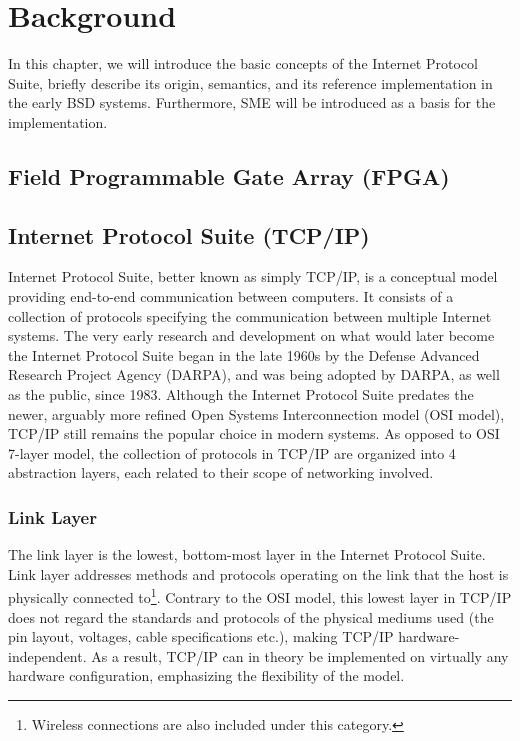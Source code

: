 \chapter{Background}


In this chapter, we will introduce the basic concepts of the Internet Protocol
Suite, briefly describe its origin, semantics, and its reference implementation
in the early BSD systems.
Furthermore, SME will be introduced as a basis for the implementation.


\section{Field Programmable Gate Array (FPGA)}



\section{Internet Protocol Suite (TCP/IP)}
Internet Protocol Suite, better known as simply TCP/IP, is a conceptual
model providing end-to-end communication between computers. It consists of
a collection of protocols specifying the communication between multiple
Internet systems\cite{RFC1122}.  The very early research and development
on what would later become the Internet Protocol Suite began in the late 1960s
by the Defense Advanced Research Project Agency (DARPA), and was being
adopted by DARPA, as well as the public, since 1983\cite{DARPA_internet}.
Although the Internet Protocol Suite predates the newer, arguably more
refined Open Systems Interconnection model (OSI model), TCP/IP still
remains the popular choice in modern systems.  As opposed to OSI 7-layer
model\cite{X.200}, the collection of protocols in TCP/IP are organized
into 4 abstraction layers, each related to their scope of networking
involved.

\subsection{Link Layer}
The link layer is the lowest, bottom-most layer in the Internet Protocol Suite.
Link layer addresses methods and protocols operating on the link that the host
is physically connected to\footnote{Wireless connections are also included
under this category.}. Contrary to the OSI model, this lowest layer in TCP/IP
does not regard the standards and protocols of the physical mediums used (the
pin layout, voltages, cable specifications etc.), making TCP/IP hardware-independent.
As a result, TCP/IP can in theory be implemented on virtually any hardware
configuration, emphasizing the flexibility of the model.

